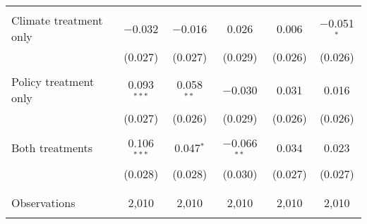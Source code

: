 \begin{tabular}{@{\extracolsep{5pt}}lccccc}
  & & & & & \\ 
 Climate treatment only & $-$0.032 & $-$0.016 & 0.026 & 0.006 & $-$0.051$^{*}$ \\ 
  & (0.027) & (0.027) & (0.029) & (0.026) & (0.026) \\ 
  & & & & & \\ 
 Policy treatment only & 0.093$^{***}$ & 0.058$^{**}$ & $-$0.030 & 0.031 & 0.016 \\ 
  & (0.027) & (0.026) & (0.029) & (0.026) & (0.026) \\ 
  & & & & & \\ 
 Both treatments & 0.106$^{***}$ & 0.047$^{*}$ & $-$0.066$^{**}$ & 0.034 & 0.023 \\ 
  & (0.028) & (0.028) & (0.030) & (0.027) & (0.027) \\ 
  & & & & & \\ 
\hline \\[-1.8ex] 

Observations & 2,010 & 2,010 & 2,010 & 2,010 & 2,010 \\ 
\hline 
\hline \\[-1.8ex] 
\end{tabular} 